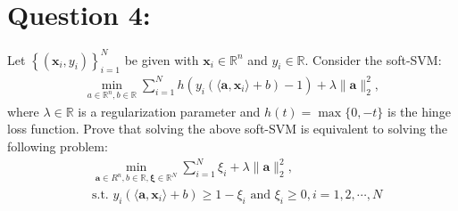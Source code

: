 \documentclass[a4paper,12pt]{article}
\newcommand{\R}{\mathbb{R}}
\begin{document}
\section*{Question 4:}
Let \(\left\{(\bm{x}_i, y_i)\right\}_{i=1}^N\) be given with \(\bm{x}_i \in \R^n\) and \(y_i \in \R\). Consider the soft-SVM:
\begin{align*}
    \min_{a\in\R^n, b\in \R} \sum_{i=1}^N h(y_i(\langle \bm{a}, \bm{x}_i\rangle + b) - 1) + \lambda\|\bm{a}\|_2^2,
\end{align*}
where \(\lambda \in \R\) is a regularization parameter and \(h(t) = \max\{0, -t\}\) is the hinge loss function. Prove that solving the above soft-SVM is equivalent to solving the following problem:
\begin{align*}
    &\min_{\bm{a} \in R^n, b \in \R, \bm{\xi} \in \R^N} \sum_{i = 1}^N \xi_i + \lambda\|\bm{a}\|_2^2, \\
    &\text{s.t. } y_i(\langle \bm{a}, \bm{x}_i\rangle + b) \geq 1 - \xi_i \text{ and } \xi_i \geq 0, i = 1,2,\cdots,N
\end{align*}
\end{document}
